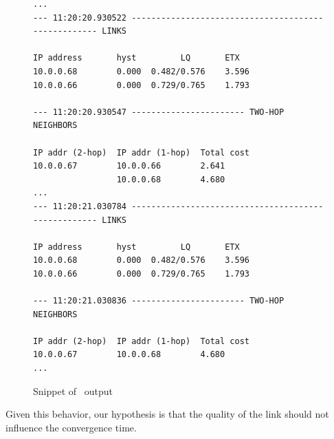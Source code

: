 \begin{figure}[tbhp]
\begin{Verbatim}[fontsize=\footnotesize]
...
--- 11:20:20.930522 ---------------------------------------------------- LINKS

IP address       hyst         LQ       ETX
10.0.0.68        0.000  0.482/0.576    3.596
10.0.0.66        0.000  0.729/0.765    1.793

--- 11:20:20.930547 ----------------------- TWO-HOP NEIGHBORS

IP addr (2-hop)  IP addr (1-hop)  Total cost
10.0.0.67        10.0.0.66        2.641
                 10.0.0.68        4.680
...
--- 11:20:21.030784 ---------------------------------------------------- LINKS

IP address       hyst         LQ       ETX
10.0.0.68        0.000  0.482/0.576    3.596
10.0.0.66        0.000  0.729/0.765    1.793

--- 11:20:21.030836 ----------------------- TWO-HOP NEIGHBORS

IP addr (2-hop)  IP addr (1-hop)  Total cost
10.0.0.67        10.0.0.68        4.680
...
\end{Verbatim}
\caption{Snippet of \olsr\ output}
\label{lst:olsr_log}
\end{figure}

Given this behavior, our hypothesis is that the quality of the link
should not influence the convergence time.